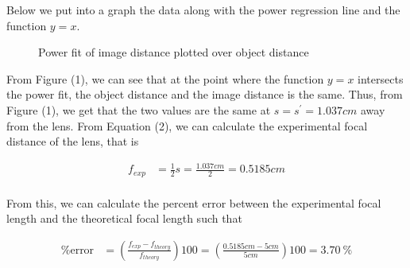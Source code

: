 \documentclass[12pt]{article}
\begin{document}
Below we put into a graph the data along with the power regression line and the function $y=x$.

\begin{figure}[H]
    \centering

    \caption[10pt]{Power fit of image distance plotted over object distance}

\end{figure}

From Figure (1), we can see that at the point where the function $y=x$ intersects the power fit, the object distance and the image distance is the same. Thus, from Figure (1), we get that the two values are the same at $s=s^\prime=1.037cm$ away from the lens. From Equation (2), we can calculate the experimental focal distance of the lens, that is

\begin{equation}
    \begin{split}
        f_{exp} &= \frac{1}{2} s = \frac{1.037cm}{2} = 0.5185cm \\
    \end{split}
\end{equation}

From this, we can calculate the percent error between the experimental focal length and the theoretical focal length such that

\begin{equation}
    \begin{split}
        \text{\% error} &= \left( \frac{f_{exp} - f_{theory}}{f_{theory}} \right) 100 = \left( \frac{0.5185cm - 5cm}{5cm} \right) 100 = \SI{3.70}{\percent} \\
    \end{split}
\end{equation}
\end{document}
